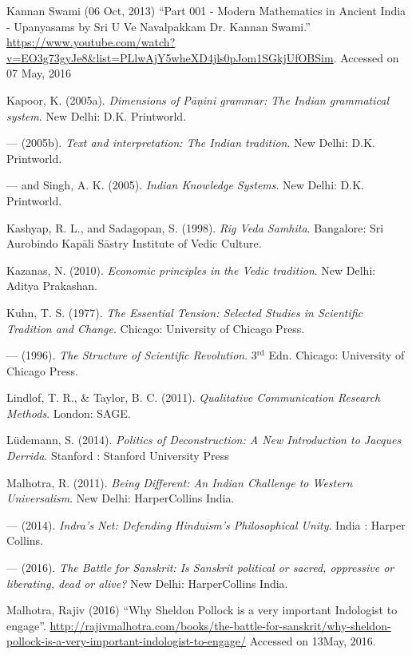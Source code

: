\begin{thebibliography}{99}
Kannan Swami (06 Oct, 2013) ``Part 001 - Modern Mathematics in Ancient India - Upanyasams by Sri U Ve Navalpakkam Dr. Kannan Swami.'' \url{https://www.youtube.com/watch?v=EO3g73gyJe8&list=PLlwAjY5wheXD4jls0pJom1SGkjUfOBSim}. Accessed on 07 May, 2016

Kapoor, K. (2005a). {\sl Dimensions of Pāṇini grammar: The Indian grammatical system}. New Delhi: D.K. Printworld.

--- (2005b). {\sl Text and interpretation: The Indian tradition}. New Delhi: D.K. Printworld. 

--- and Singh, A. K. (2005). {\sl Indian Knowledge Systems}. New Delhi: D.K. Printworld.

Kashyap, R. L., and Sadagopan, S. (1998). {\sl Rig Veda Samhita}. Bangalore: Sri Aurobindo Kapāli Sāstry Institute of Vedic Culture.

Kazanas, N. (2010). {\sl Economic principles in the Vedic tradition}. New Delhi: Aditya Prakashan.

Kuhn, T. S. (1977). {\sl The Essential Tension: Selected Studies in Scientific Tradition and Change}. Chicago: University of Chicago Press.

--- (1996). {\sl The Structure of Scientific Revolution}. 3$^{\text{rd}}$ Edn. Chicago: University of Chicago Press.

Lindlof, T. R., \& Taylor, B. C. (2011). {\sl Qualitative Communication Research Methods}. London: SAGE.

Lüdemann, S. (2014). {\sl Politics of Deconstruction: A New Introduction to Jacques Derrida}. Stanford : Stanford University Press

Malhotra, R. (2011). {\sl Being Different: An Indian Challenge to Western Universalism}. New Delhi: HarperCollins  India. 

--- (2014). {\sl Indra's Net: Defending Hinduism's Philosophical Unity}. India : Harper Collins.

--- (2016). {\sl The Battle for Sanskrit: Is Sanskrit political or sacred, oppressive or liberating, dead or alive?} New Delhi: HarperCollins India.

Malhotra, Rajiv  (2016) ``Why Sheldon Pollock is a very important Indologist to engage''. \url{http://rajivmalhotra.com/books/the-battle-for-sanskrit/why-sheldon-pollock-is-a-very-important-indologist-to-engage/} Accessed on 13May, 2016.


\end{thebibliography}
